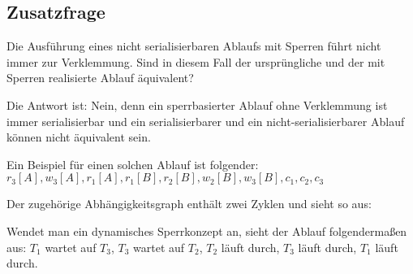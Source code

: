 \subsection*{Zusatzfrage}

Die Ausführung eines nicht serialisierbaren Ablaufs mit Sperren führt nicht immer zur Verklemmung.
Sind in diesem Fall der ursprüngliche und der mit Sperren realisierte Ablauf äquivalent?

\begin{solution}
Die Antwort ist: Nein, denn ein sperrbasierter Ablauf ohne Verklemmung ist immer serialisierbar und ein serialisierbarer und ein nicht-serialisierbarer Ablauf können nicht äquivalent sein.

Ein Beispiel für einen solchen Ablauf ist folgender: \\
$r_3[A], w_3[A], r_1[A], r_1[B], r_2[B], w_2[B], w_3[B], c_1, c_2, c_3$

Der zugehörige Abhängigkeitsgraph enthält zwei Zyklen und sieht so aus:


Wendet man ein dynamisches Sperrkonzept an, sieht der Ablauf folgendermaßen aus: $T_1$ wartet auf $T_3$, $T_3$ wartet auf $T_2$, $T_2$ läuft durch, $T_3$ läuft durch, $T_1$ läuft durch.
\end{solution}
